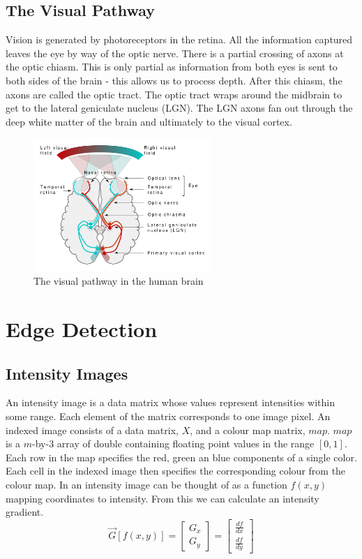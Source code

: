 \documentclass{article}
\begin{document}
	\subsection{The Visual Pathway}
	Vision is generated by photoreceptors in the retina. All the information captured leaves the eye by way of the optic nerve. There is a partial crossing of axons at the optic chiasm. This is only partial as information from both eyes is sent to both sides of the brain - this allows us to process depth. After this chiasm, the axons are called the optic tract. The optic tract wraps around the midbrain to get to the lateral geniculate nucleus (LGN). The LGN axons fan out through the deep white matter of the brain and ultimately to the visual cortex.
	\begin{figure}[h]
		\centering
		\includegraphics[width=0.6\textwidth]{visual_pathway}
		\caption{The visual pathway in the human brain}
		\label{fig:visual pathway}
	\end{figure}
	
	
	\section{Edge Detection}
	\subsection{Intensity Images}
	An intensity image is a data matrix whose values represent intensities within some range. Each element of the matrix corresponds to one image pixel. An indexed image consists of a data matrix, $X$, and a colour map matrix, $map$. $map$ is a $m$-by-3 array of double containing floating point values in the range $[0, 1]$. Each row in the map specifies the red, green an blue components of a single color. Each cell in the indexed image then specifies the corresponding colour from the colour map. In an intensity image can be thought of as a function $f(x, y)$ mapping coordinates to intensity. From this we can calculate an intensity gradient.
	\begingroup
	\renewcommand*{\arraystretch}{1.5}
	\[ \overrightarrow{G}[f(x,y)] = \begin{bmatrix}G_{x} \\ G_{y} \end{bmatrix} = \begin{bmatrix} \frac{df}{dx} \\ \frac{df}{dy} \end{bmatrix} \]	
	\endgroup
\end{document}
